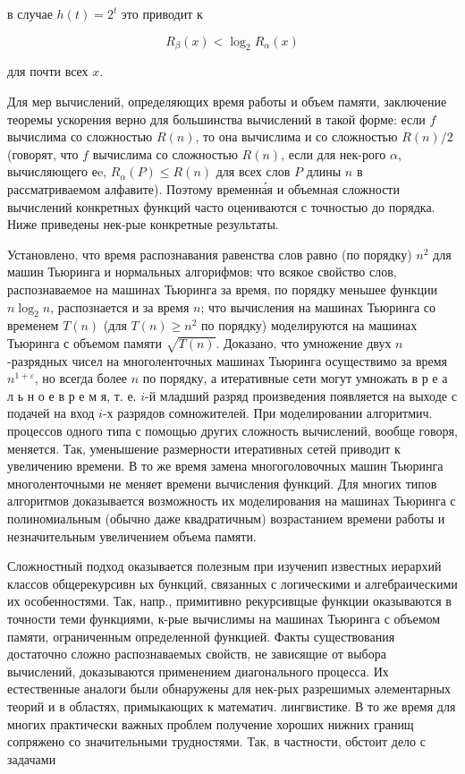 \documentclass[10pt]{article}
\begin{document}
в случае $h(t)=2^{t}$ это приводит к



\[

R_{\beta}(x)<\log _{2} R_{\alpha}(x)

\]



для почти всех $x$.



Для мер вычислений, определяющих время работы и объем памяти, заключение теоремы ускорения верно для большинства вычислений в такой форме: если $f$ вычислима со сложностью $R(n)$, то она вычислима и со сложностью $R(n) / 2$ (говорят, что $f$ вычислима со сложностью $R(n)$, если для нек-рого $\alpha$, вычисляющего еe, $R_{\alpha}(P) \leqslant R(n)$ для всех слов $P$ длины $n$ в рассматриваемом алфавите). Поэтому временна́я и объемная сложности вычислений конкретных функций часто оцениваются с точностью до порядка. Ниже приведены нек-рые конкретные результаты.



Установлено, что время распознавания равенства слов равно (по порядку) $n^{2}$ для машин Тьюринга и нормальных алгорифмов; что всякое свойство слов, распознаваемое на машинах Тьюринга за время, по порядку меньшее функции $n \log _{2} n$, распознается и за время $n$; что вычисления на машинах Тьюринга со временем $T(n)$ (для $T(n) \geqslant n^{2}$ по порядку) моделируются на машинах Тьюринга с объемом памяти $\sqrt{T(n)}$. Доказано, что умножение двух $n$-разрядных чисел на многоленточных машинах Тьюринга осуществимо за время $n^{1+\varepsilon}$, но всегда более $n$ по порядку, а итеративные сети могут умножать в р е а л ь н о е в р е м я, т. е. $i$-й младший разряд произведения появляется на выходе с подачей на вход $i$-х разрядов сомножителей. При моделировании алгоритмич. процессов одного типа с помощью других сложность вычислений, вообще говоря, меняется. Так, уменышение размерности итеративных сетей приводит к увеличению времени. В то же время замена многоголовочных машин Тьюринга многоленточными не меняет времени вычисления функций. Для многих типов алгоритмов доказывается возможность их моделирования на машинах Тьюринга с полиномиальным (обычно даже квадратичным) возрастанием времени работы и незначительным увеличением объема памяти.



Сложностный подход оказывается полезным при изученип известных иерархий классов общерекурсивн ых бункций, связанных с логическими и алгебраическими их особенностями. Так, напр., примитивно рекурсивщые функции оказываются в точности теми функциями, к-рые вычислимы на машинах Тьюринга с объемом памяти, ограниченным определенной функцией. Факты существования достаточно сложно распознаваемых свойств, не зависящие от выбора вычислений, доказываются применением диагонального процесса. Их естественные аналоги были обнаружены для нек-рых разрешимых әлементарных теорий и в областях, примыкающих к математич. лингвистике. В то же время для многих практически важных проблем получение хороших нижних гранищ сопряжено со значительными трудностями. Так, в частности, обстоит дело с задачами
\end{document}
